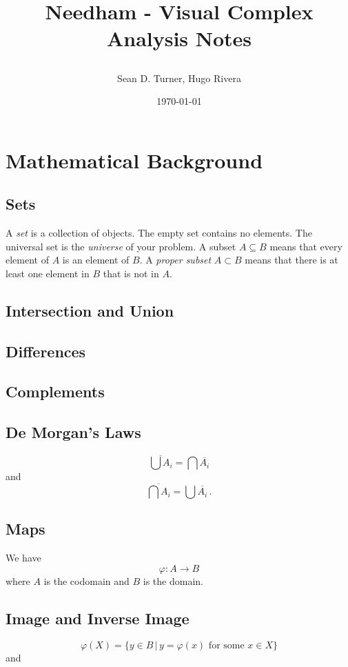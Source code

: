 \documentclass[12pt]{article}
\title{Needham - Visual Complex Analysis Notes \date{\today}}
\author{Sean D. Turner, Hugo Rivera}
\theoremstyle{definition}
\begin{document}
\maketitle

\section{Mathematical Background}

\subsection{Sets}

A \emph{set} is a collection of objects. The empty set contains no elements. The universal set is the \emph{universe} of your problem. A subset $A \subseteq B$ means that every element of $A$ is an element of $B$. A \emph{proper subset} $A \subset B$ means that there is at least one element in $B$ that is not in $A$.

\subsection{Intersection and Union}
\subsection{Differences}
\subsection{Complements}
\subsection{De Morgan's Laws}
$$\overline{\bigcup A_i} = \bigcap \overline{A_i}$$ and $$\overline{\bigcap A_i} = \bigcup \overline{A_i}\,.$$

\subsection{Maps}

We have $$\varphi : A \to B$$ where $A$ is the codomain and $B$ is the domain. 

\subsection{Image and Inverse Image}

$$\varphi(X) = \{y \in B \, | \, y = \varphi(x) \text{ for some } x \in X\}$$ and
\end{document}
